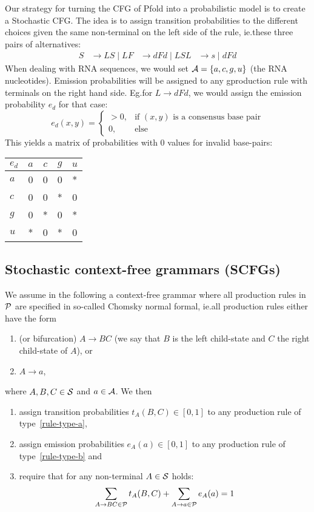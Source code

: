 Our strategy for turning the CFG of Pfold into a probabilistic model is to
create a Stochastic CFG.  The idea is to assign transition probabilities to
the different choices given the same non-terminal on the left side of the rule,
ie.\@ these three pairs of alternatives:
\begin{align}
  S &\to LS \mid L
  F &\to dFd \mid LS
  L &\to s \mid dFd
\end{align}
When dealing with RNA sequences, we would set \(\mathcal{A}=\{a,c,g,u\}\)
(the RNA nucleotides).  Emission probabilities will be assigned to any
gproduction rule with terminals on the right hand side.  Eg.\@ for \(L\to dFd\),
we would assign the emission probability \(e_d\) for that case:
\[
  e_d(x,y) = \begin{cases}
      >0, &\text{if \((x,y)\) is a consensus base pair} \\
      0, &\text{else}
  \end{cases}
\]
This yields a matrix of probabilities with \(0\) values for invalid base-pairs:
\begin{table}[H]
\centering
\begin{tabular}{l|cccc}
    $e_d$ & $a$ & $c$ & $g$ & $u$ \\
    \hline 
    $a$   & 0   & 0   & 0   & *   \\
    $c$   & 0   & 0   & *   & 0   \\
    $g$   & 0   & *   & 0   & *   \\
    $u$   & *   & 0   & *   & 0
\end{tabular}
\end{table}

\subsection{Stochastic context-free grammars (SCFGs)}

We assume in the following a context-free grammar where all production rules in
\(\mathcal{P}\) are specified in so-called Chomsky normal formal, ie.\@ all
production rules either have the form
\begin{enumerate}[label=(\alph*)]
\item\label{rule-type-a} (or bifurcation) \(A\to BC\) (we say that \(B\) is the
  left child-state and \(C\) the right child-state of \(A\)), or
\item\label{rule-type-b} \(A\to a\),
\end{enumerate}
where \(A,B,C\in\mathcal{S}\) and \(a\in\mathcal{A}\).  We then
\begin{enumerate}[label=\arabic*.]
\item assign transition probabilities \(t_A(B,C)\in[0,1]\) to any production
  rule of type~\ref{rule-type-a},
\item assign emission probabilities \(e_A(a)\in[0,1]\) to any production rule of
  type~\ref{rule-type-b} and
\item require that for any non-terminal \(A\in\mathcal{S}\) holds:
  \[
    \sum_{A\to BC\in\mathcal{P}} t_A(B,C) + \sum_{A\to a\in\mathcal{P}} e_A(a) = 1
  \]
\end{enumerate}

